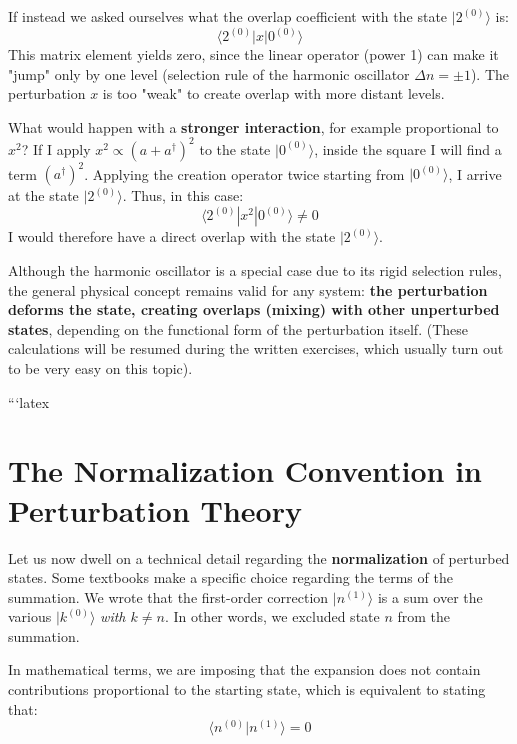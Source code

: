 If instead we asked ourselves what the overlap coefficient with the state $\vert{}2^{(0)}\rangle$ is:
\begin{equation}
\langle 2^{(0)} | x | 0^{(0)} \rangle
\end{equation}
This matrix element yields zero, since the linear operator (power 1) can make it "jump" only by one level (selection rule of the harmonic oscillator $\Delta n = \pm 1$). The perturbation $x$ is too "weak" to create overlap with more distant levels.

What would happen with a \textbf{stronger interaction}, for example proportional to $x^2$?
If I apply $x^2 \propto (a + a^\dagger)^2$ to the state $\vert{}0^{(0)}\rangle$, inside the square I will find a term $(a^\dagger)^2$. Applying the creation operator twice starting from $\vert{}0^{(0)}\rangle$, I arrive at the state $\vert{}2^{(0)}\rangle$. Thus, in this case:
\begin{equation}
\langle 2^{(0)} | x^2 | 0^{(0)} \rangle \neq 0
\end{equation}
I would therefore have a direct overlap with the state $\vert{}2^{(0)}\rangle$.

Although the harmonic oscillator is a special case due to its rigid selection rules, the general physical concept remains valid for any system: \textbf{the perturbation deforms the state, creating overlaps (mixing) with other unperturbed states}, depending on the functional form of the perturbation itself. (These calculations will be resumed during the written exercises, which usually turn out to be very easy on this topic).

```latex
\section{The Normalization Convention in Perturbation Theory}

Let us now dwell on a technical detail regarding the \textbf{normalization} of perturbed states.
Some textbooks make a specific choice regarding the terms of the summation. We wrote that the first-order correction $\vert{}n^{(1)}\rangle$ is a sum over the various $\vert{}k^{(0)}\rangle$ \textit{with $k \neq n$}. In other words, we excluded state $n$ from the summation.

In mathematical terms, we are imposing that the expansion does not contain contributions proportional to the starting state, which is equivalent to stating that:
\begin{equation}
\langle n^{(0)} | n^{(1)} \rangle = 0
\end{equation}

